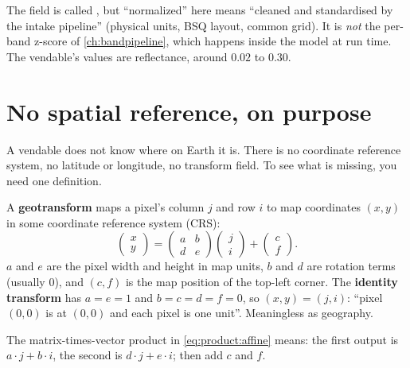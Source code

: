 \begin{sourcenote}
The field is called , but ``normalized'' here means ``cleaned
and standardised by the intake pipeline'' (physical units, BSQ layout, common grid). It is
\emph{not} the per-band z-score of \cref{ch:bandpipeline}, which happens inside the model at run
time. The vendable's values are reflectance, around $0.02$ to $0.30$.
\end{sourcenote}

\section{No spatial reference, on purpose}\label{sec:product:georef}

A vendable does not know where on Earth it is. There is no coordinate reference system, no
latitude or longitude, no transform field. To see what is missing, you need one definition.

\begin{definition}
A \textbf{geotransform} maps a pixel's column $j$ and row $i$ to map coordinates $(x, y)$ in some
coordinate reference system (CRS):
\begin{equation}\label{eq:product:affine}
\begin{pmatrix} x \\ y \end{pmatrix} =
\begin{pmatrix} a & b \\ d & e \end{pmatrix}
\begin{pmatrix} j \\ i \end{pmatrix} +
\begin{pmatrix} c \\ f \end{pmatrix}.
\end{equation}
$a$ and $e$ are the pixel width and height in map units, $b$ and $d$ are rotation terms (usually
$0$), and $(c, f)$ is the map position of the top-left corner. The \textbf{identity transform} has
$a = e = 1$ and $b = c = d = f = 0$, so $(x, y) = (j, i)$: ``pixel $(0,0)$ is at $(0,0)$ and each
pixel is one unit''. Meaningless as geography.
\end{definition}

The matrix-times-vector product in \cref{eq:product:affine} means: the first output is
$a \cdot j + b \cdot i$, the second is $d \cdot j + e \cdot i$; then add $c$ and $f$.


